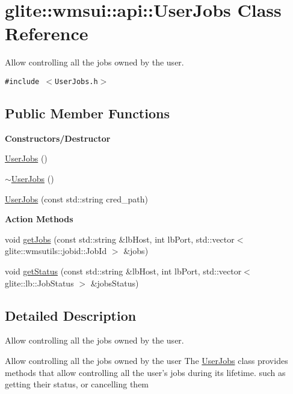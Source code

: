 \hypertarget{classglite_1_1wmsui_1_1api_1_1UserJobs}{
\section{glite::wmsui::api::User\-Jobs Class Reference}
\label{classglite_1_1wmsui_1_1api_1_1UserJobs}
}
Allow controlling all the jobs owned by the user.  


{\tt \#include $<$User\-Jobs.h$>$}

\subsection*{Public Member Functions}
\begin{Indent}{\bf Constructors/Destructor}\par
\begin{CompactItemize}
\item 
\hyperlink{classglite_1_1wmsui_1_1api_1_1UserJobs_z27_0}{User\-Jobs} ()
\item 
\hyperlink{classglite_1_1wmsui_1_1api_1_1UserJobs_z27_1}{$\sim$User\-Jobs} ()
\item 
\hyperlink{classglite_1_1wmsui_1_1api_1_1UserJobs_z27_2}{User\-Jobs} (const std::string cred\_\-path)
\end{CompactItemize}
\end{Indent}
\begin{Indent}{\bf Action Methods}\par
\begin{CompactItemize}
\item 
void \hyperlink{classglite_1_1wmsui_1_1api_1_1UserJobs_z29_0}{get\-Jobs} (const std::string \&lb\-Host, int lb\-Port, std::vector$<$ glite::wmsutils::jobid::Job\-Id $>$ \&jobs)
\item 
void \hyperlink{classglite_1_1wmsui_1_1api_1_1UserJobs_z29_1}{get\-Status} (const std::string \&lb\-Host, int lb\-Port, std::vector$<$ glite::lb::Job\-Status $>$ \&jobs\-Status)
\end{CompactItemize}
\end{Indent}


\subsection{Detailed Description}
Allow controlling all the jobs owned by the user. 

Allow controlling all the jobs owned by the user The \hyperlink{classglite_1_1wmsui_1_1api_1_1UserJobs}{User\-Jobs} class provides methods that allow controlling all the user's jobs during its lifetime. such as getting their status, or cancelling them

